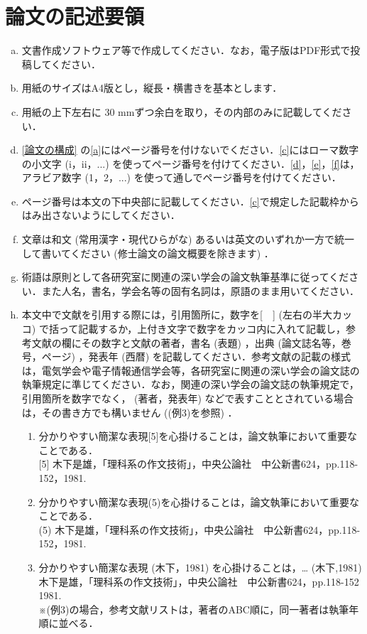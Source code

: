 \documentclass[12pt]{kupaper}
\begin{document}
\chapter{論文の記述要領}
\begin{enumerate}[a.]
	\item 文書作成ソフトウェア等で作成してください．なお，電子版はPDF形式で投稿してください．
	\item 用紙のサイズはA4版とし，縦長・横書きを基本とします．
	\item 用紙の上下左右に 30 mmずつ余白を取り，その内部のみに記載してください．
	\item \ref{論文の構成} の\ref{a}にはページ番号を付けないでください．\ref{c}にはローマ数字の小文字 (i，ii，...) を使ってページ番号を付けてください．\ref{d}，\ref{e}，\ref{f}は，アラビア数字 (1，2，...) を使って通しでページ番号を付けてください．
	\item ページ番号は本文の下中央部に記載してください．\ref{c}で規定した記載枠からはみ出さないようにしてください．
	\item 文章は和文 (常用漢字・現代ひらがな) あるいは英文のいずれか一方で統一して書いてください (修士論文の論文概要を除きます) ．
	\item 術語は原則として各研究室に関連の深い学会の論文執筆基準に従ってください．また人名，書名，学会名等の固有名詞は，原語のまま用いてください．
	\item 本文中で文献を引用する際には，引用箇所に，数字を[　] (左右の半大カッコ) で括って記載するか，上付き文字で数字をカッコ内に入れて記載し，参考文献の欄にその数字と文献の著者，書名 (表題) ，出典 (論文誌名等，巻号，ページ) ，発表年 (西暦) を記載してください．参考文献の記載の様式は，電気学会や電子情報通信学会等，各研究室に関連の深い学会の論文誌の執筆規定に準じてください．なお，関連の深い学会の論文誌の執筆規定で，引用箇所を数字でなく， (著者，発表年) などで表すこととされている場合は，その書き方でも構いません ((例3)を参照) ．

	      \begin{enumerate}[(例1)]
		      \item
		            分かりやすい簡潔な表現[5]を心掛けることは，論文執筆において重要なことである．\\
		            {[5]} 木下是雄，「理科系の作文技術」，中央公論社　中公新書624，pp.118-152，1981.
		      \item
		            分かりやすい簡潔な表現(5)を心掛けることは，論文執筆において重要なことである．\\
		            (5) 木下是雄，「理科系の作文技術」，中央公論社　中公新書624，pp.118-152，1981.
		      \item \label{例3}
		            分かりやすい簡潔な表現 (木下，1981) を心掛けることは，…
		            (木下,1981)  \\
		            木下是雄，「理科系の作文技術」，中央公論社　中公新書624，pp.118-152 1981.\\
		            ※(例3)の場合，参考文献リストは，著者のABC順に，同一著者は執筆年順に並べる．
	      \end{enumerate}


\end{enumerate}
\end{document}
